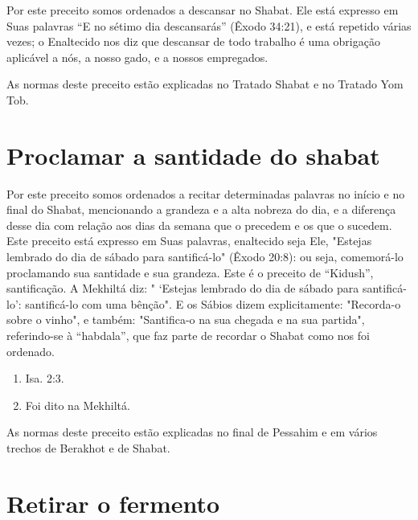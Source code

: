 Por este preceito somos ordenados a descansar no Shabat. Ele está
expresso em Suas palavras ``E no sétimo dia descansarás'' (Êxodo 34:21), e
está repetido várias vezes; o Enaltecido nos diz que descansar de todo
trabalho é uma obrigação aplicável a nós, a nosso gado, e a nossos
empregados.

As normas deste preceito estão explicadas no Tratado Shabat e no Tratado
Yom Tob.

\section{Proclamar a santidade do shabat}

Por este preceito somos ordenados a recitar determinadas palavras no
início e no final do Shabat, mencionando a grandeza e a alta nobreza do
dia, e a diferença desse dia com relação aos dias da semana que o
precedem e os que o sucedem. Este preceito está expresso em Suas
palavras, enaltecido seja Ele, "Estejas lembrado do dia de sábado para
santificá-lo" (Êxodo 20:8): ou seja, comemorá-lo proclamando sua
santidade e sua grandeza. Este é o pre­ceito de ``Kidush'', santificação.
A Mekhiltá diz: " `Estejas lembrado do dia de sábado para santificá-lo':
santificá-lo com uma bênção". E os Sábios dizem ex­plicitamente:
"Recorda-o sobre o vinho", e também: "Santifica-o na sua chega­da e na
sua partida", referindo-se à ``habdala'', que faz parte de recordar o
Sha­bat como nos foi ordenado.


\begin{enumerate}
\def\labelenumi{\arabic{enumi}.}
\setcounter{enumi}{180}
\item
 
 Isa. 2:3.
 
\item
 
 Foi dito na Mekhiltá.
 
\end{enumerate}




As normas deste preceito estão explicadas no final de Pessahim e em
vários trechos de Berakhot e de Shabat.

\section{Retirar o fermento}


